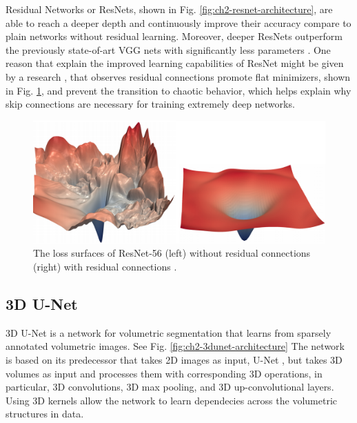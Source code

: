 Residual Networks or ResNets, shown in Fig. \ref{fig:ch2-resnet-architecture}, are able to reach a deeper depth and continuously improve their accuracy compare to plain networks without residual learning. Moreover, deeper ResNets outperform the previously state-of-art VGG nets \cite{Simonyan15vggnets} with significantly less parameters \cite{He2016Resnet}. One reason that explain the improved learning capabilities of ResNet might be given by a research \cite{visualloss}, that observes residual connections promote flat minimizers, shown in Fig. \ref{fig:ch2-resnet-loss}, and prevent the transition to chaotic behavior, which helps explain why skip connections are necessary for training extremely deep networks.

\begin{figure}
	\centering
	\includegraphics[width=0.8\columnwidth]{figures/ch2/resnet-loss.png}
	\caption{The loss surfaces of ResNet-56 (left) without residual connections (right) with residual connections \cite{visualloss}.} 
	\label{fig:ch2-resnet-loss}
\end{figure}
         
\subsection{3D U-Net}
\label{ch3:3dunet}
3D U-Net \cite{iek20163Dunet} is a network for volumetric segmentation that learns from sparsely annotated volumetric images. See Fig. \ref{fig:ch2-3dunet-architecture} The network is based on its predecessor that takes 2D images as input, U-Net \cite{2015unet}, but takes 3D volumes as input and processes them with corresponding 3D operations, in particular, 3D convolutions, 3D max pooling, and 3D up-convolutional layers. Using 3D kernels allow the network to learn dependecies across the volumetric structures in data. 

